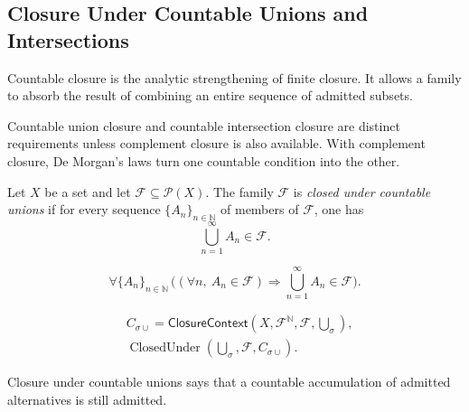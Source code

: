 \subsection{Closure Under Countable Unions and Intersections}

\begin{remark*}[Exposition]
Countable closure is the analytic strengthening of finite closure.  It allows
a family to absorb the result of combining an entire sequence of admitted
subsets.
\end{remark*}

\begin{remark*}[Exposition]
Countable union closure and countable intersection closure are distinct
requirements unless complement closure is also available.  With complement
closure, De Morgan's laws turn one countable condition into the other.
\end{remark*}

\begin{definition}\label{def:closed-under-countable-unions}
Let \(X\) be a set and let \(\mathcal{F}\subseteq\mathcal{P}(X)\).  The family
\(\mathcal{F}\) is \emph{closed under countable unions} if for every sequence
\(\{A_n\}_{n\in\mathbb{N}}\) of members of \(\mathcal{F}\), one has
\[
  \bigcup_{n=1}^{\infty} A_n \in \mathcal{F}.
\]
\end{definition}

\begin{remark*}
\[
  \forall \{A_n\}_{n\in\mathbb{N}}\,
  \bigl((\forall n,\ A_n\in\mathcal{F})
  \Rightarrow
  \bigcup_{n=1}^{\infty}A_n\in\mathcal{F}\bigr).
\]
\end{remark*}

\begin{remark*}
\[
\begin{aligned}
&C_{\sigma\cup}
=\mathsf{ClosureContext}(X,\mathcal{F}^{\mathbb{N}},\mathcal{F},\bigcup_{\sigma}),\\
&\operatorname{ClosedUnder}(\bigcup_{\sigma},\mathcal{F},C_{\sigma\cup}).
\end{aligned}
\]
\end{remark*}

\begin{remark*}[Interpretation]
Closure under countable unions says that a countable accumulation of admitted
alternatives is still admitted.
\end{remark*}

